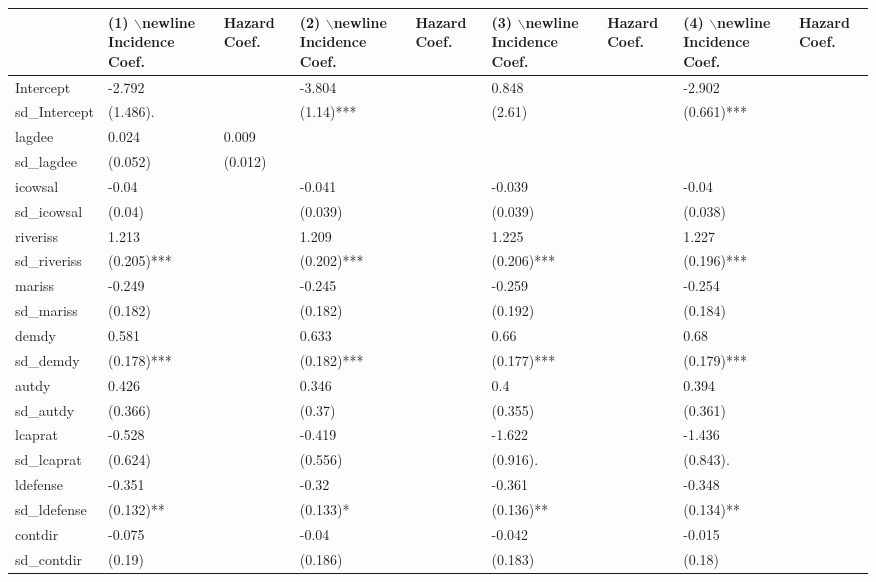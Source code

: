 \begin{table}[ht]
\centering
\begin{tabular}{lllllllll}
  \hline
  & (1) $\backslash$newline Incidence Coef. &  Hazard Coef. & (2) $\backslash$newline Incidence Coef. &  Hazard Coef. & (3) $\backslash$newline Incidence Coef. &  Hazard Coef. & (4) $\backslash$newline Incidence Coef. &  Hazard Coef. \\ 
  \hline
Intercept & -2.792 &  & -3.804 &  & 0.848 &  & -2.902 &  \\ 
  sd\_Intercept & (1.486). &  & (1.14)*** &  & (2.61)  &  & (0.661)*** &  \\ 
  lagdee & 0.024 & 0.009 &  &  &  &  &  &  \\ 
  sd\_lagdee & (0.052)  & (0.012)  &  &  &  &  &  &  \\ 
  icowsal & -0.04 &  & -0.041 &  & -0.039 &  & -0.04 &  \\ 
  sd\_icowsal & (0.04)  &  & (0.039)  &  & (0.039)  &  & (0.038)  &  \\ 
  riveriss & 1.213 &  & 1.209 &  & 1.225 &  & 1.227 &  \\ 
  sd\_riveriss & (0.205)*** &  & (0.202)*** &  & (0.206)*** &  & (0.196)*** &  \\ 
  mariss & -0.249 &  & -0.245 &  & -0.259 &  & -0.254 &  \\ 
  sd\_mariss & (0.182)  &  & (0.182)  &  & (0.192)  &  & (0.184)  &  \\ 
  demdy & 0.581 &  & 0.633 &  & 0.66 &  & 0.68 &  \\ 
  sd\_demdy & (0.178)*** &  & (0.182)*** &  & (0.177)*** &  & (0.179)*** &  \\ 
  autdy & 0.426 &  & 0.346 &  & 0.4 &  & 0.394 &  \\ 
  sd\_autdy & (0.366)  &  & (0.37)  &  & (0.355)  &  & (0.361)  &  \\ 
  lcaprat & -0.528 &  & -0.419 &  & -1.622 &  & -1.436 &  \\ 
  sd\_lcaprat & (0.624)  &  & (0.556)  &  & (0.916). &  & (0.843). &  \\ 
  ldefense & -0.351 &  & -0.32 &  & -0.361 &  & -0.348 &  \\ 
  sd\_ldefense & (0.132)** &  & (0.133)* &  & (0.136)** &  & (0.134)** &  \\ 
  contdir & -0.075 &  & -0.04 &  & -0.042 &  & -0.015 &  \\ 
  sd\_contdir & (0.19)  &  & (0.186)  &  & (0.183)  &  & (0.18)  &  \\ 

\end{tabular}
\end{table}
